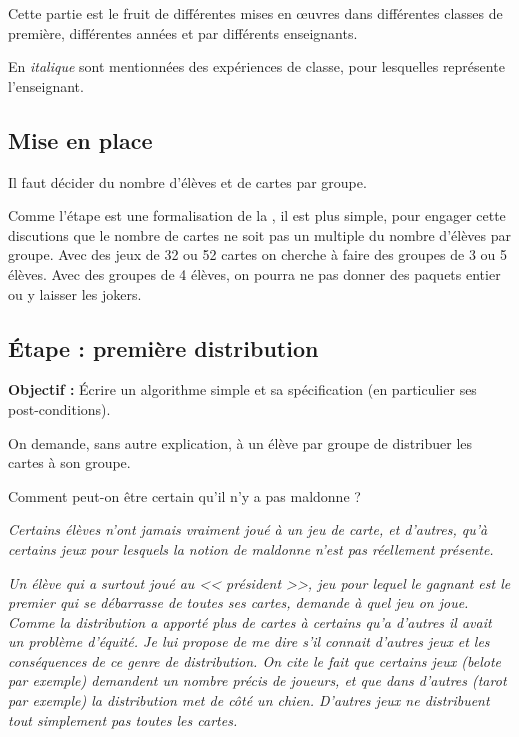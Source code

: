 Cette partie est le fruit de différentes mises en œuvres dans différentes classes de première, différentes années et par différents enseignants. 

En {\itshape italique} sont mentionnées des expériences de classe, pour lesquelles  représente l'enseignant.

\subsection{Mise en place}

Il faut décider du nombre d'élèves et de cartes par groupe.

Comme l'étape  est une formalisation de la , il est plus simple, pour engager cette discutions que le nombre de cartes ne soit pas un multiple du nombre d'élèves par groupe. Avec des jeux de 32 ou 52 cartes on cherche à faire des groupes de 3 ou 5 élèves. Avec des groupes de 4 élèves, on pourra ne pas donner des paquets entier ou y laisser les jokers.

\subsection{Étape  : première distribution}

{\bfseries Objectif :} Écrire un algorithme simple et sa spécification (en particulier ses post-conditions).

\medskip

On demande, sans autre explication, à un élève par groupe de distribuer les cartes à son groupe.

\begin{question}Comment peut-on être certain qu'il n'y a pas maldonne ?\end{question}

\textit{Certains élèves n'ont jamais vraiment joué à un jeu de carte, et d'autres, qu'à certains jeux pour lesquels la notion de maldonne n'est pas réellement présente.}

\textit{Un élève qui a surtout joué au << président >>, jeu pour lequel le gagnant est le premier qui se débarrasse de toutes ses cartes, demande à quel jeu on joue. Comme la distribution a apporté plus de cartes à certains qu'a d'autres il avait un problème d'équité. Je lui propose de me dire s'il connait d'autres jeux et les conséquences de ce genre de distribution. On cite le fait que certains jeux (belote par exemple) demandent un nombre précis de joueurs, et que dans d'autres (tarot par exemple) la distribution met de côté un chien. D'autres jeux ne distribuent tout simplement pas toutes les cartes.}


